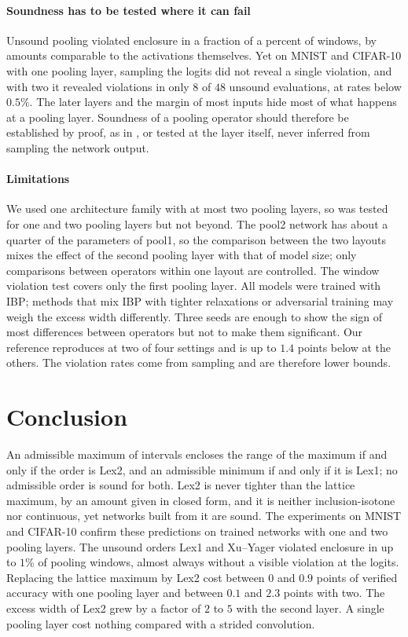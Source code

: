 \documentclass[preprint,12pt]{elsarticle}
\theoremstyle{definition}
\begin{document}
\paragraph{Soundness has to be tested where it can fail} Unsound pooling violated enclosure in a fraction of a percent of windows, by amounts comparable to the activations themselves. Yet on MNIST and CIFAR-10 with one pooling layer, sampling the logits did not reveal a single violation, and with two it revealed violations in only $8$ of $48$ unsound evaluations, at rates below $0.5\%$. The later layers and the margin of most inputs hide most of what happens at a pooling layer. Soundness of a pooling operator should therefore be established by proof, as in , or tested at the layer itself, never inferred from sampling the network output.

\paragraph{Limitations} We used one architecture family with at most two pooling layers, so  was tested for one and two pooling layers but not beyond. The pool2 network has about a quarter of the parameters of pool1, so the comparison between the two layouts mixes the effect of the second pooling layer with that of model size; only comparisons between operators within one layout are controlled. The window violation test covers only the first pooling layer. All models were trained with IBP; methods that mix IBP with tighter relaxations or adversarial training \cite{zhang2020crownibp,muller2023sabr,depalma2024} may weigh the excess width differently. Three seeds are enough to show the sign of most differences between operators but not to make them significant. Our reference reproduces \citet{shi2021} at two of four settings and is up to $1.4$ points below at the others. The violation rates come from sampling and are therefore lower bounds.

\section{Conclusion}
\label{sec:conclusion}

An admissible maximum of intervals encloses the range of the maximum if and only if the order is Lex2, and an admissible minimum if and only if it is Lex1; no admissible order is sound for both. Lex2 is never tighter than the lattice maximum, by an amount given in closed form, and it is neither inclusion-isotone nor continuous, yet networks built from it are sound. The experiments on MNIST and CIFAR-10 confirm these predictions on trained networks with one and two pooling layers. The unsound orders Lex1 and Xu--Yager violated enclosure in up to $1\%$ of pooling windows, almost always without a visible violation at the logits. Replacing the lattice maximum by Lex2 cost between $0$ and $0.9$ points of verified accuracy with one pooling layer and between $0.1$ and $2.3$ points with two. The excess width of Lex2 grew by a factor of $2$ to $5$ with the second layer. A single pooling layer cost nothing compared with a strided convolution.
\end{document}
